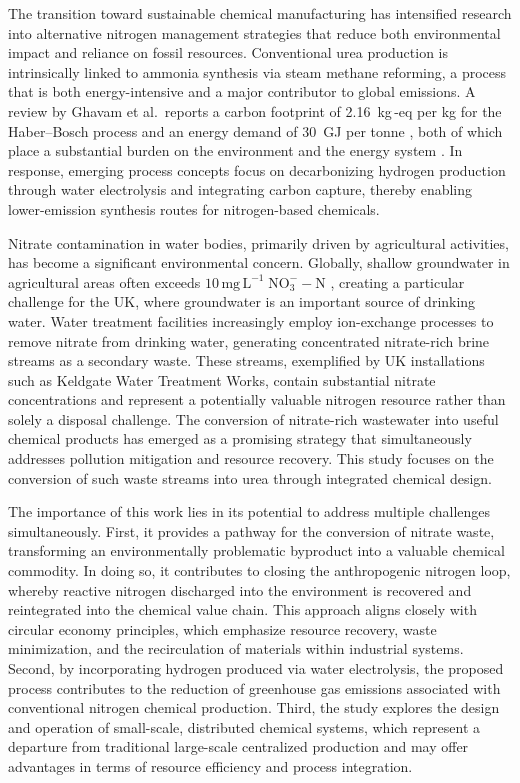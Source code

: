 \documentclass[letterpaper]{article}
\begin{document}
The transition toward sustainable chemical manufacturing has
intensified research into alternative nitrogen management strategies
that reduce both environmental impact and reliance on fossil
resources. Conventional urea production is intrinsically linked to
ammonia synthesis via steam methane reforming, a process that is both
energy-intensive and a major contributor to global 
emissions. A review by Ghavam et al.\ reports a carbon footprint of
2.16~kg\,-eq per kg  for the Haber--Bosch process and
an energy demand of 30~GJ per tonne , both of which place a
substantial burden on the environment and the energy system
\cite{Ghavam2021SustainableAmmonia}. In response, emerging process
concepts focus on decarbonizing hydrogen production through water
electrolysis and integrating carbon capture, thereby enabling
lower-emission synthesis routes for nitrogen-based chemicals.

Nitrate contamination in water bodies, primarily driven by
agricultural activities, has become a significant environmental
concern. Globally, shallow groundwater in agricultural areas often
exceeds $10\,\mathrm{mg\,L^{-1}}\;\mathrm{NO_3^{-}{-}N}$
\cite{Nolan2006Nitrate}, creating a particular challenge for the UK,
where groundwater is an important source of drinking water. Water
treatment facilities increasingly employ ion-exchange processes to
remove nitrate from drinking water, generating concentrated
nitrate-rich brine streams as a secondary waste. These streams,
exemplified by UK installations such as Keldgate Water Treatment
Works, contain substantial nitrate concentrations and represent a
potentially valuable nitrogen resource rather than solely a disposal
challenge. The conversion of nitrate-rich wastewater into useful
chemical products has emerged as a promising strategy that
simultaneously addresses pollution mitigation and resource
recovery. This study focuses on the conversion of such waste streams
into urea through integrated chemical design.

The importance of this work lies in its potential to address multiple
challenges simultaneously. First, it provides a pathway for the
conversion of nitrate waste, transforming an environmentally
problematic byproduct into a valuable chemical commodity. In doing
so, it contributes to closing the anthropogenic nitrogen loop,
whereby reactive nitrogen discharged into the environment is
recovered and reintegrated into the chemical value chain. This
approach aligns closely with circular economy principles, which
emphasize resource recovery, waste minimization, and the
recirculation of materials within industrial systems. Second, by
incorporating hydrogen produced via water electrolysis, the proposed
process contributes to the reduction of greenhouse gas emissions
associated with conventional nitrogen chemical production. Third, the
study explores the design and operation of small-scale, distributed
chemical systems, which represent a departure from traditional
large-scale centralized production and may offer advantages in terms
of resource efficiency and process integration.
\end{document}
